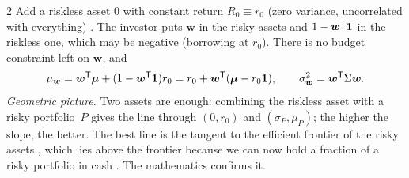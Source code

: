 \begin{paracol}{2}
Add a riskless asset $0$ with constant return $R_0\equiv r_0$ (zero variance, uncorrelated with everything)
. The investor puts $\bm w$ in the risky assets and $1-\bm w^{\mathsf T}\bm 1$ in the riskless one, which
may be negative (borrowing at $r_0$). There is no budget constraint left on $\bm w$, and
\begin{equation}\label{ch10:eq-mvrf}
  \mu_{\bm w}=\bm w^{\mathsf T}\bm\mu+(1-\bm w^{\mathsf T}\bm 1)r_0=r_0+\bm w^{\mathsf T}(\bm\mu-r_0\bm 1),\qquad \sigma_{\bm w}^2=\bm w^{\mathsf T}\Sigma\bm w .
\end{equation}
\emph{Geometric picture.} Two assets are enough: combining the riskless asset with a risky portfolio~$P$ gives the
line through $(0,r_0)$ and $(\sigma_P,\mu_P)$; the higher the slope, the better. The best line is the tangent to
the efficient frontier of the risky assets , which lies above the frontier
because we can now hold a fraction of a risky portfolio in cash . The mathematics confirms it.


\end{paracol}
